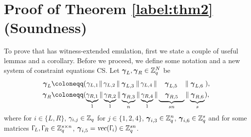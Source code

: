 \section{Proof of Theorem \ref{label:thm2} (Soundness)}
\label{scnProofTheorem2}
\vspace{-3pt}
To prove that \proto has witness-extended emulation, first we state a couple of useful lemmas and a corollary.
Before we proceed, we define some notation and a new system of constraint equations \textsf{CS}. Let ${\boldsymbol{\gamma}}_L, {\boldsymbol{\gamma}}_R \in \mathbb{Z}_q^N$ be
\begin{align*}
    \vecnb{\gamma}_{L} 
    &\coloneqq 
    (\hspace{0.25mm} \gamma_{L,1} \hspace{0.25mm} \|
    \hspace{0.58mm} \gamma_{L,2} \hspace{0.55mm}\|
    \hspace{0.9mm} \vecnb{\gamma}_{L,3} \hspace{0.9mm}\|
    \hspace{0.6mm} \gamma_{L,4} \hspace{0.6mm}\|
    \hspace{4mm}
    \vecnb{\gamma}_{L,5}
    \hspace{4mm} \|
    \hspace{1mm} \vecnb{\gamma}_{L,6} \hspace{1mm}),\\
    \vecnb{\gamma}_{R} &\coloneqq 
    (\underbrace{\hspace{-0.2mm} \gamma_{R,1} \hspace{-0.2mm}}_{1} \|
    \underbrace{\hspace{-0.2mm} \gamma_{R,2} \hspace{-0.2mm}}_{1}\|
    \underbrace{\hspace{0.1mm} \vecnb{\gamma}_{R,3} \hspace{0.1mm}}_{n}\|
    \underbrace{\hspace{-0.2mm} \gamma_{R,4} \hspace{-0.2mm}}_{1}\|
    \underbrace{\hspace{3.2mm} \vecnb{\gamma}_{R,5} \hspace{3.2mm}}_{sn} \|
    \underbrace{\hspace{0.38mm} \vecnb{\gamma}_{R,6} \hspace{0.38mm}}_{s}),
\end{align*}
where for $i \in \{L,R\}$, $\gamma_{i,j} \in \mathbb{Z}_q$ for $j\in \{1,2,4\}$, ${\boldsymbol{\gamma}}_{i,3} \in \mathbb{Z}_q^n$, ${\boldsymbol{\gamma}}_{i,6} \in \mathbb{Z}_q^s$ and for some matrices $\Upgamma_L, \Upgamma_R \in \mathbb{Z}_q^{s \times n}$, ${\boldsymbol{\gamma}}_{i,5} = \textsl{vec}(\Upgamma_{i}) \in \mathbb{Z}_q^{sn}$.
